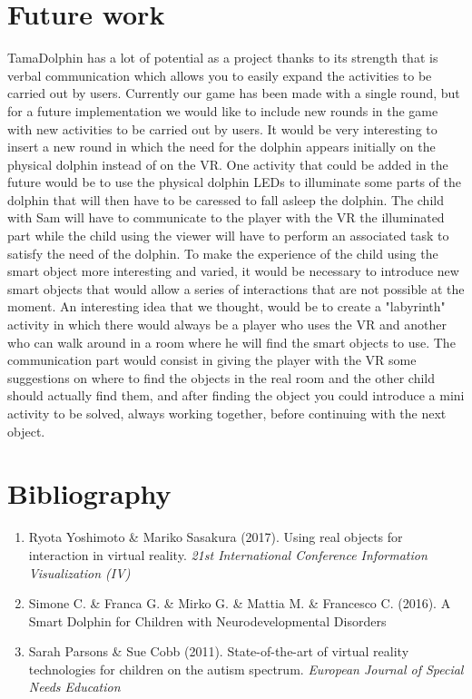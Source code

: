 \documentclass [12pt]{article}
\begin{document}
\section{Future work}
TamaDolphin has a lot of potential as a project thanks to its strength that is verbal communication which allows you to easily expand the activities to be carried out by users. Currently our game has been made with a single round, but for a future implementation we would like to include new rounds in the game with new activities to be carried out by users. It would be very interesting to insert a new round in which the need for the dolphin appears initially on the physical dolphin instead of on the VR.
One activity that could be added in the future would be to use the physical dolphin LEDs to illuminate some parts of the dolphin that will then have to be caressed to fall asleep the dolphin. 
The child with Sam will have to communicate to the player with the VR the illuminated part while the child using the viewer will have to perform an associated task to satisfy the need of the dolphin.
To make the experience of the child using the smart object more interesting and varied, it would be necessary to introduce new smart objects that would allow a series of interactions that are not possible at the moment. An interesting idea that we thought, would be to create a "labyrinth" activity in which there would always be a player who uses the VR and another who can walk around in a room where he will find the smart objects to use. The communication part would consist in giving the player with the VR some suggestions on where to find the objects in the real room and the other child should actually find them, and after finding the object you could introduce a mini activity to be solved, always working together, before continuing with the next object.
\section{Bibliography}
\begin{enumerate}
\item Ryota Yoshimoto \& Mariko Sasakura (2017). Using real objects for interaction in virtual reality. \textit{21st International Conference Information Visualization (IV)}

\item Simone C. \& Franca G. \& Mirko G. \& Mattia M. \& Francesco C. (2016). A Smart Dolphin for Children with Neurodevelopmental Disorders

\item Sarah Parsons \& Sue Cobb (2011). State-of-the-art of virtual reality technologies for children on the autism spectrum. \textit{European Journal of Special Needs Education}

\end{enumerate}
\end{document}
